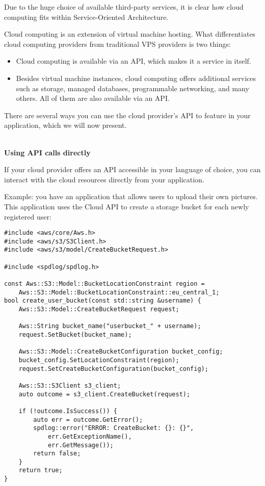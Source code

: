 Due to the huge choice of available third-party services, it is clear how cloud computing fits within Service-Oriented Architecture.


Cloud computing is an extension of virtual machine hosting. What differentiates cloud computing providers from traditional VPS providers is two things:

\begin{itemize}
\item 
Cloud computing is available via an API, which makes it a service in itself.

\item 
Besides virtual machine instances, cloud computing offers additional services such as storage, managed databases, programmable networking, and many others. All of them are also available via an API.
\end{itemize}

There are several ways you can use the cloud provider's API to feature in your application, which we will now present.

\hspace*{\fill} \\ %
\noindent
\textbf{Using API calls directly}

If your cloud provider offers an API accessible in your language of choice, you can interact with the cloud resources directly from your application.

Example: you have an application that allows users to upload their own pictures. This application uses the Cloud API to create a storage bucket for each newly registered user:

\begin{lstlisting}[style=styleCXX]
#include <aws/core/Aws.h>
#include <aws/s3/S3Client.h>
#include <aws/s3/model/CreateBucketRequest.h>

#include <spdlog/spdlog.h>

const Aws::S3::Model::BucketLocationConstraint region =
	Aws::S3::Model::BucketLocationConstraint::eu_central_1;
bool create_user_bucket(const std::string &username) {
	Aws::S3::Model::CreateBucketRequest request;
	
	Aws::String bucket_name("userbucket_" + username);
	request.SetBucket(bucket_name);
	
	Aws::S3::Model::CreateBucketConfiguration bucket_config;
	bucket_config.SetLocationConstraint(region);
	request.SetCreateBucketConfiguration(bucket_config);
	
	Aws::S3::S3Client s3_client;
	auto outcome = s3_client.CreateBucket(request);
	
	if (!outcome.IsSuccess()) {
		auto err = outcome.GetError();
		spdlog::error("ERROR: CreateBucket: {}: {}",
			err.GetExceptionName(),
			err.GetMessage());
		return false;
	}
	return true;
}
\end{lstlisting}

